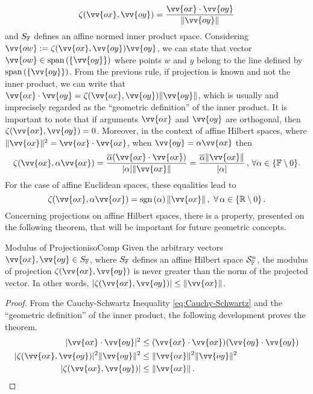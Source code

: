 \begin{equation}\label{eq:projection}
\fua{\zeta}{\vv{ox},\vv{oy}}=\dfrac{\vv{ox}\cdot \vv{oy}}{\|\vv{oy}\|}
\end{equation}
and $S_\cam{F}$ defines an affine normed inner product space. Considering $\vv{ow}:=\fua{\zeta}{\vv{ox},\vv{oy}}\vv{oy}$, we can state that vector $\vv{ow}\in\spn{(\{\vv{oy}\})}$ where points $w$ and $y$ belong to the line defined by $\spn{(\{\vv{oy}\})}$. From the previous rule, if projection is known and not the inner product, we can write that $\vv{ox}\cdot \vv{oy}=\fua{\zeta}{\vv{ox},\vv{oy}}\|\vv{oy}\|$, which is usually and imprecisely regarded as the ``geometric definition'' of the inner product. It is important to note that if arguments $\vv{ox}$ and $\vv{oy}$ are orthogonal, then $\fua{\zeta}{\vv{ox},\vv{oy}}=0$.
 Moreover, in the context of affine Hilbert spaces, where $\|\vv{ox}\|^2=\vv{ox}\cdot \vv{ox}$, when $\vv{oy}=\alpha\vv{ox}$ then
\begin{equation}\label{eq:projColinear}
\fua{\zeta}{\vv{ox},\alpha\vv{ox}}=\dfrac{\overline{\alpha}(\vv{ox}\cdot \vv{ox})}{|\alpha|\|\vv{ox}\|}=\dfrac{\overline{\alpha}\|\vv{ox}\|}{|\alpha|}\,,\,\forall\alpha\in\{\cam{F}\setminus 0\}.
\end{equation}
For the case of affine Euclidean spaces, these equalities lead to
\begin{equation}\label{eq:projColinearEuclid}
\fua{\zeta}{\vv{ox},\alpha\vv{ox}}=\sgn{\alpha}\|\vv{ox}\|\,,\,\,\forall\,\alpha\in\{\real\setminus 0\}\,.
\end{equation}
Concerning projections on affine Hilbert spaces, there is a property, presented on the following theorem, that will be important for future geometric concepts.

\begin{mteo}{Modulus of Projection}{isoComp}
Given the arbitrary vectors $\vv{ox},\vv{oy}\in S_\cam{F}$, where $S_\cam{F}$ defines an affine Hilbert space $\eamd{S}{F}{n}$, the modulus of projection $\fua{\zeta}{\vv{ox},\vv{oy}}$ is never greater than the norm of the projected vector. In other words,
$|\fua{\zeta}{\vv{ox},\vv{oy}}|\leq \|\vv{ox}\|$.
\end{mteo}

{\footnotesize
\begin{proof}
From the Cauchy-Schwartz Inequality \eqref{eq:Cauchy-Schwartz} and the ``geometric definition'' of the inner product, the following development proves the theorem.
\begin{align*}
|\vv{ox}\cdot\vv{oy}|^2 &\leq (\vv{ox}\cdot\vv{ox})(\vv{oy}\cdot\vv{oy})\\
|\fua{\zeta}{\vv{ox},\vv{oy}}|^2\|\vv{oy}\|^2 &\leq \|\vv{ox}\|^2\|\vv{oy}\|^2\\
|\fua{\zeta}{\vv{ox},\vv{oy}}| &\leq \|\vv{ox}\|\,.
\end{align*}
\end{proof}}

